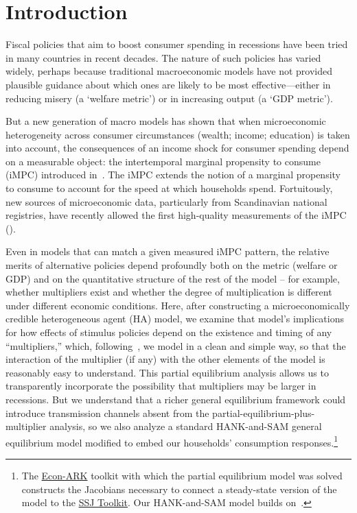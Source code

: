 \documentclass[qe]{econsocart}
\begin{document}


\section{Introduction}
\label{sec:intro} 
\setcounter{page}{0}

Fiscal policies that aim to boost consumer spending in recessions have been tried in many countries in recent decades.  The nature of such policies has varied widely, perhaps because traditional macroeconomic models have not provided plausible guidance about which ones are likely to be most effective---either in reducing misery (a `welfare metric') or in increasing output (a `GDP metric').

But a new generation of macro models has shown that when microeconomic heterogeneity across consumer circumstances (wealth; income; education) is taken into account, the consequences of an income shock for consumer spending depend on a measurable object: the intertemporal marginal propensity to consume (iMPC) introduced in~\cite{auclert2018IKC}.  The iMPC extends the notion of a marginal propensity to consume to account for the speed at which households spend.  Fortuitously, new sources of microeconomic data, particularly from Scandinavian national registries, have recently allowed the first high-quality measurements of the iMPC (\cite{fagereng-mpc-2021}).

Even in models that can match a given measured iMPC pattern, the relative merits of alternative policies depend profoundly both on the metric (welfare or GDP) and on the quantitative structure of the rest of the model -- for example, whether multipliers exist and whether the degree of multiplication is different under different economic conditions. Here, after constructing a microeconomically credible heterogeneous agent (HA) model, we examine that model's implications for how effects of stimulus policies depend on the existence and timing of any ``multipliers,'' which, following~\cite{kmpHandbook}, we model in a clean and simple way, so that the interaction of the multiplier (if any) with the other elements of the model is reasonably easy to understand.
This partial equilibrium analysis allows us to transparently incorporate the possibility that multipliers may be larger in recessions.  But we understand that a richer general equilibrium framework could introduce transmission channels absent from the partial-equilibrium-plus-multiplier analysis, so we also analyze a standard HANK-and-SAM general equilibrium model modified to embed our households' consumption responses.\footnote{The \href{https://econ-ark.org}{Econ-ARK} toolkit with which the partial equilibrium model was solved constructs the Jacobians necessary to connect a steady-state version of the model to the \href{https://github.com/shade-econ/sequence-jacobian}{SSJ Toolkit}. Our HANK-and-SAM model builds on~\cite{Ravn2017,Ravn2021}.}
\end{document}

